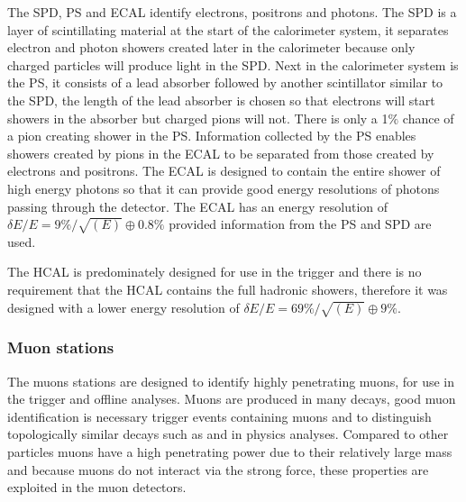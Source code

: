 The SPD, PS and ECAL identify electrons, positrons and photons. The SPD is a layer of scintillating material at the start of the calorimeter system, it separates electron and photon showers created later in the calorimeter because only charged particles will produce light in the SPD. Next in the calorimeter system is the PS, it consists of a lead absorber followed by another scintillator similar to the SPD, the length of the lead absorber is chosen so that electrons will start showers in the absorber but charged pions will not. There is only a 1$\%$ chance of a pion creating shower in the PS. Information collected by the PS enables showers created by pions in the ECAL to be separated from those created by electrons and positrons. The ECAL is designed to contain the entire shower of high energy photons so that it can provide good energy resolutions of photons passing through the detector. The ECAL has an energy resolution of $\delta E / E = 9\%/\sqrt{(E)} \oplus 0.8\%$  provided information from the PS and SPD are used. 

The HCAL is predominately designed for use in the trigger and there is no requirement that the HCAL contains the full hadronic showers, therefore it was designed with a lower energy resolution of $\delta E / E = 69\% / \sqrt{(E)} \oplus 9\%$. 


\subsubsection{Muon stations}
\label{Muon_stations}

The muons stations are designed to identify highly penetrating muons, for use in the trigger and offline analyses. Muons are produced in many \bhadron decays, good muon identification is necessary trigger events containing muons and to distinguish topologically similar decays such as \bmumu and \bdkpi in physics analyses. 
Compared to other particles muons have a high penetrating power due to their relatively large mass and because muons do not interact via the strong force, these properties are exploited in the muon detectors. 

